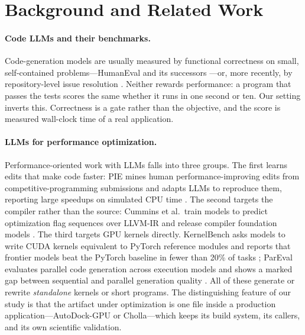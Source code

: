\section{Background and Related Work}
\label{sec:relatedwork}
\paragraph{Code LLMs and their benchmarks.}
Code-generation models are usually measured by functional correctness on small, self-contained
problems---HumanEval and its successors \cite{chen2021codex}---or, more recently, by repository-level
issue resolution \cite{jimenez2024swebench}. Neither rewards performance: a program that passes the
tests scores the same whether it runs in one second or ten. Our setting inverts this. Correctness is a
gate rather than the objective, and the score is measured wall-clock time of a real application.

\paragraph{LLMs for performance optimization.}
Performance-oriented work with LLMs falls into three groups. The first learns edits that make code
faster: PIE mines human performance-improving edits from competitive-programming submissions and adapts
LLMs to reproduce them, reporting large speedups on simulated CPU time \cite{shypula2024pie}. The
second targets the compiler rather than the source: Cummins et al.\ train models to predict
optimization flag sequences over LLVM-IR \cite{cummins2023llmopt} and release compiler foundation
models \cite{cummins2024llmcompiler}. The third targets GPU kernels directly. KernelBench asks models
to write CUDA kernels equivalent to PyTorch reference modules and reports that frontier models beat the
PyTorch baseline in fewer than 20\% of tasks \cite{ouyang2025kernelbench}; ParEval evaluates parallel
code generation across execution models and shows a marked gap between sequential and parallel
generation quality \cite{nichols2024parallel}. All of these generate or rewrite \emph{standalone}
kernels or short programs. The distinguishing feature of our study is that the artifact under
optimization is one file inside a production application---AutoDock-GPU or Cholla---which keeps
its build system, its callers, and its own scientific validation.

